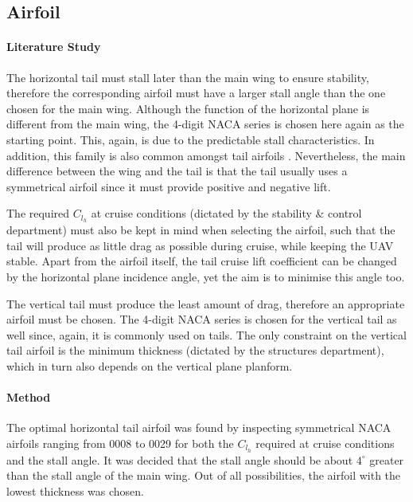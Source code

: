 \subsection*{Airfoil}

\paragraph{Literature Study} The horizontal tail must stall later than the main wing to ensure stability, therefore the corresponding airfoil must have a larger stall angle than the one chosen for the main wing. Although the function of the horizontal plane is different from the main wing, the 4-digit NACA series is chosen here again as the starting point. This, again, is due to the predictable stall characteristics. In addition, this family is also common amongst tail airfoils \cite[23]{airtail}. Nevertheless, the main difference between the wing and the tail is that the tail usually uses a symmetrical airfoil since it must provide positive and negative lift. 

The required $C_{l_{h}}$ at cruise conditions (dictated by the stability \& control department) must also be kept in mind when selecting the airfoil, such that the tail will produce as little drag as possible during cruise, while keeping the UAV stable. Apart from the airfoil itself, the tail cruise lift coefficient can be changed by the horizontal plane incidence angle, yet the aim is to minimise this angle too.


The vertical tail must produce the least amount of drag, therefore an appropriate airfoil must be chosen. The 4-digit NACA series is chosen for the vertical tail as well since, again, it is commonly used on tails. The only constraint on the vertical tail airfoil is the minimum thickness (dictated by the structures department), which in turn also depends on the vertical plane planform.

\paragraph{Method} The optimal horizontal tail airfoil was found by inspecting symmetrical NACA airfoils ranging from 0008 to 0029 for both the $C_{l_{h}}$ required at cruise conditions and the stall angle. It was decided that the stall angle should be about $4^{\circ}$ greater than the stall angle of the main wing. Out of all possibilities, the airfoil with the lowest thickness was chosen.

